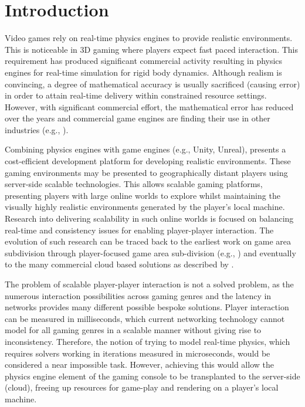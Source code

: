 \chapter{Introduction}
Video games rely on real-time physics engines to provide realistic environments. This is noticeable in 3D gaming where players expect fast paced interaction. This requirement has produced significant commercial activity resulting in physics engines for real-time simulation for rigid body dynamics. Although realism is convincing, a degree of mathematical accuracy is usually sacrificed (causing error) in order to attain real-time delivery within constrained resource settings. However, with significant commercial effort, the mathematical error has reduced over the years and commercial game engines are finding their use in other industries (e.g.,  \cite{Xu2017, Lu2017, Shah2018}).

Combining physics engines with game engines (e.g., Unity, Unreal), presents a cost-efficient development platform for developing realistic environments. These gaming environments may be presented to geographically distant players using server-side scalable technologies. This allows scalable gaming platforms, presenting players with large online worlds to explore whilst maintaining the visually highly realistic environments generated by the player's local machine. Research into delivering scalability in such online worlds is focused on balancing real-time and consistency issues for enabling player-player interaction. The evolution of such research can be traced back to the earliest work on game area subdivision \cite{Npsnet} through player-focused game area sub-division (e.g., \cite{Morgan2005InterestManagement, Greenhalgh}) and eventually to the many commercial cloud based solutions as described by \cite{iCloudAccess}.

The problem of scalable player-player interaction is not a solved problem, as the numerous interaction possibilities across gaming genres and the latency in networks provides many different possible bespoke solutions. Player interaction can be measured in milliseconds, which current networking technology cannot model for all gaming genres in a scalable manner without giving rise to inconsistency. Therefore, the notion of trying to model real-time physics, which requires solvers working in iterations measured in microseconds, would be considered a near impossible task. However, achieving this would allow the physics engine element of the gaming console to be transplanted to the server-side (cloud), freeing up resources for game-play and rendering on a player's local machine.

